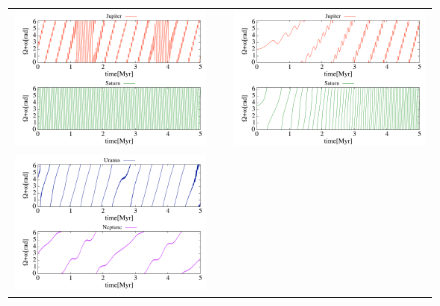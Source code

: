 \documentclass[11pt,a4paper,oneside,onecolumn]{jarticle}
\begin{document}
\begin{figure}[H]
\begin{tabular}{ccc}
\begin{minipage}[t]{0.45\hsize}
\centering
\includegraphics[width=8cm]{./image/NoMove_curlypi_5Myr_JUPSAT.pdf}
\end{minipage} &
\begin{minipage}[t]{0.1\hsize}
\end{minipage} &
\begin{minipage}[t]{0.45\hsize}
\centering
\includegraphics[width=8cm]{./image/Move500kyr_curlypi_5Myr_JUPSAT.pdf}
\end{minipage}\\
\begin{minipage}[t]{0.45\hsize}
\centering
\includegraphics[width=8cm]{./image/NoMove_curlypi_5Myr_URANEP.pdf}
\end{minipage} &

\end{tabular}
\end{figure}
\end{document}
